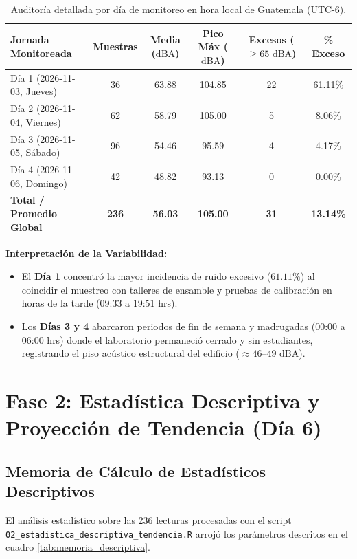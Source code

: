 \documentclass{article}
\begin{document}
\begin{table}[H]
\centering
\caption{Auditoría detallada por día de monitoreo en hora local de Guatemala (UTC-6).}
\label{tab:auditoria_fase1}
\vspace{0.2cm}
\begin{tabular}{l c c c c c}
\toprule
\textbf{Jornada Monitoreada} & \textbf{Muestras} & \textbf{Media ($\text{dBA}$)} & \textbf{Pico Máx ($\text{dBA}$)} & \textbf{Excesos ($\ge 65\text{ dBA}$)} & \textbf{\% Exceso} \\
\midrule
Día 1 (2026-11-03, Jueves) & 36 & 63.88 & 104.85 & 22 & 61.11\% \\
Día 2 (2026-11-04, Viernes) & 62 & 58.79 & 105.00 & 5 & 8.06\% \\
Día 3 (2026-11-05, Sábado) & 96 & 54.46 & 95.59 & 4 & 4.17\% \\
Día 4 (2026-11-06, Domingo) & 42 & 48.82 & 93.13 & 0 & 0.00\% \\
\midrule
\textbf{Total / Promedio Global} & \textbf{236} & \textbf{56.03} & \textbf{105.00} & \textbf{31} & \textbf{13.14\%} \\
\bottomrule
\end{tabular}
\end{table}

\noindent\textbf{Interpretación de la Variabilidad:}
\begin{itemize}
    \item El \textbf{Día 1} concentró la mayor incidencia de ruido excesivo ($61.11\%$) al coincidir el muestreo con talleres de ensamble y pruebas de calibración en horas de la tarde (09:33 a 19:51 hrs).
    \item Los \textbf{Días 3 y 4} abarcaron periodos de fin de semana y madrugadas (00:00 a 06:00 hrs) donde el laboratorio permaneció cerrado y sin estudiantes, registrando el piso acústico estructural del edificio ($\approx 46\text{--}49\text{ dBA}$).
\end{itemize}

\section{Fase 2: Estadística Descriptiva y Proyección de Tendencia (Día 6)}

\subsection{Memoria de Cálculo de Estadísticos Descriptivos}
El análisis estadístico sobre las 236 lecturas procesadas con el script \texttt{02\_estadistica\_descriptiva\_tendencia.R} arrojó los parámetros descritos en el cuadro \ref{tab:memoria_descriptiva}.
\end{document}
